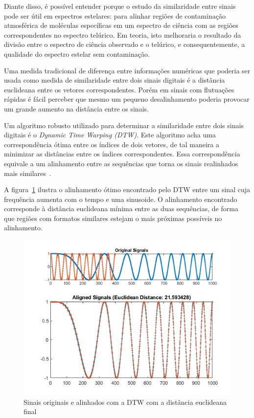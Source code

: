 Diante disso, é possível entender porque o estudo da similaridade entre sinais pode ser útil em espectros estelares: para alinhar regiões de contaminação atmosférica de moléculas específicas em um espectro de ciência com as regiões correspondentes no espectro telúrico. Em teoria, isto melhoraria o resultado da divisão entre o espectro de ciência observado e o telúrico, e consequentemente, a qualidade do espectro estelar sem contaminação.

Uma medida tradicional de diferença entre informações numéricas que poderia ser usada como medida de similaridade entre dois sinais digitais é a distância euclideana entre os vetores correspondentes. Porém em sinais com flutuações rápidas é fácil perceber que mesmo um pequeno desalinhamento poderia provocar um grande aumento na distância entre os sinais.

Um algoritmo robusto utilizado para determinar a similaridade entre dois sinais digitais é o \textit{Dynamic Time Warping (DTW)}. Este algoritmo acha uma correspondência ótima entre os índices de dois vetores, de tal maneira a minimizar as distâncias entre os índices correspondentes. Essa correspondência equivale a um alinhamento entre as sequências que torna os sinais realinhados mais similares~\citep{shou2005fast}. 

A figura~\ref{fig:matlab-dtw} ilustra o alinhamento ótimo encontrado pelo DTW entre um sinal cuja frequência aumenta com o tempo e uma sinusoide. O alinhamento encontrado corresponde à distância euclideana mínima entre as duas sequências, de forma que regiões com formatos similares estejam o mais próximas possíveis no alinhamento.

\begin{figure}[htb]
\centering
\includegraphics[width=12cm]{figuras/DynamicTimeWarpingOfRealChirpAndSinusoidExample_01.png}
\caption{Sinais originais e alinhados com a DTW com a distância euclideana final \citep{matlab-dtw}}
\label{fig:matlab-dtw}
\end{figure}


